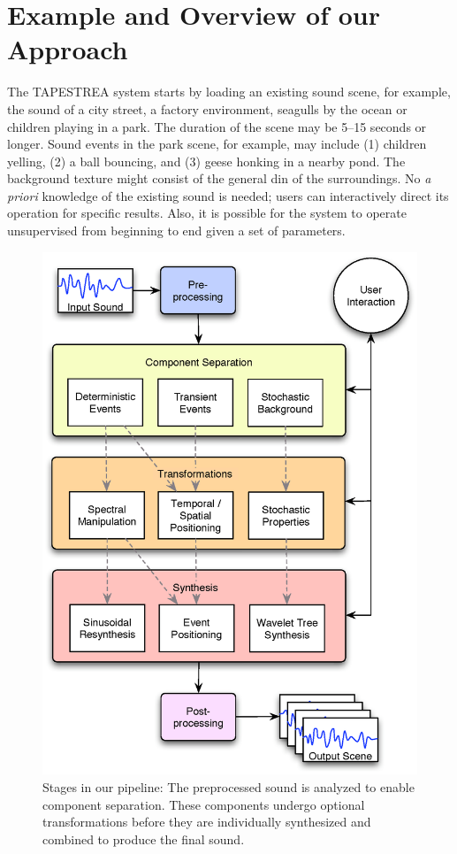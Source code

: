 \documentclass[review]{acmsiggraph}      %
\begin{document}

\section{Example and Overview of our Approach}

The TAPESTREA system starts by loading an existing sound scene, for example, the sound 
of a city street, a factory environment, seagulls by the ocean or children playing in a park.
The duration of the scene may be 5--15 seconds or longer. Sound events in the park scene, 
for example, may include (1) children yelling, (2) 
a ball bouncing, and (3) geese honking in a nearby pond. The background texture might 
consist of the general din of the surroundings. No 
{\it a priori} knowledge of the existing sound is needed; users can interactively 
direct its operation for specific results.  Also, it is possible for the system to operate
unsupervised from beginning to end given a set of parameters.

\begin{figure}[h]
\centering
\includegraphics[width=.95\columnwidth]{ourpipeline2.eps}
\caption{Stages in our pipeline: The preprocessed sound is analyzed to enable component separation. These components undergo optional transformations before they are individually synthesized and combined to produce the final sound.}
\label{fig:pipeline}
\end{figure}
\end{document}

